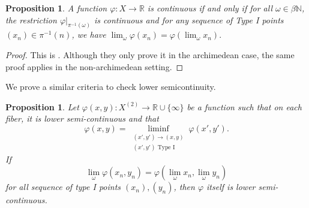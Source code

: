 \documentclass[10pt]{amsart}
\newcommand{\bb}{\mathbb}
\newcommand{\vphi}{\varphi}
\numberwithin{theorem}{section}
\newtheorem{proposition}[theorem]{Proposition}
\numberwithin{example}{section}
\numberwithin{definition}{section}
\begin{document}
\begin{proposition} \label{ContinuityCriterion1}
A function $\vphi: X \to \bb{R}$ is continuous if and only if for all $\omega \in \beta \bb{N}$, the restriction $\vphi \vert_{\pi^{-1}(\omega)}$ is continuous and for any sequence of Type I points $(x_n) \in \pi^{-1}(n)$, we have $\lim_{\omega} \vphi(x_n) = \vphi(\lim_{\omega} x_n).$
\end{proposition}

\begin{proof}
This is \cite[Lemma 4.14]{FG24}. Although they only prove it in the archimedean case, the same proof applies in the non-archimedean setting.    
\end{proof}

We prove a similar criteria to check lower semicontinuity. 

\begin{proposition} \label{ContinuityCriterion2}
Let $\vphi(x,y): X^{(2)} \to \bb{R} \cup \{ \infty\}$ be a function such that on each fiber, it is lower semi-continuous and that 
\begin{equation} \label{eq: SemiContinuity1}
\vphi(x,y) = \liminf_{\substack{ (x',y') \to (x,y) \\ (x',y') \text{ Type I}}} \vphi(x',y').
\end{equation}
If
\begin{equation} \label{eq: SemiContinuity2}
\lim_{\omega} \vphi(x_n,y_n) = \vphi(\lim_{\omega} x_n, \lim_{\omega} y_n)
\end{equation}
for all sequence of type I points $(x_n), (y_n)$, then $\vphi$ itself is lower semi-continuous. 
\end{proposition}
\end{document}
